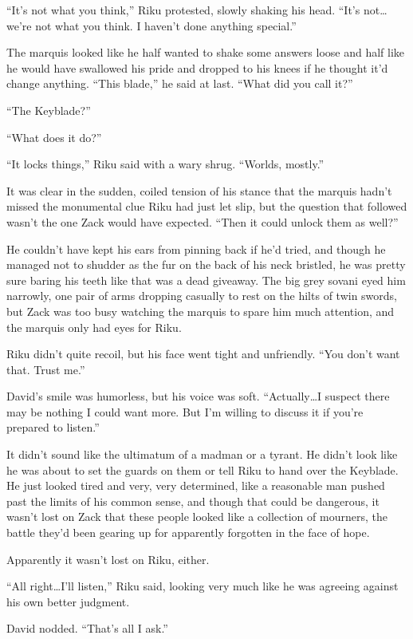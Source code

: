 ``It's not what you think,'' Riku protested, slowly shaking his head. ``It's not\ldots we're not what you think. I haven't done anything special.''

The marquis looked like he half wanted to shake some answers loose and half like he would have swallowed his pride and dropped to his knees if he thought it'd change anything. ``This blade,'' he said at last. ``What did you call it?''

``The Keyblade?''

``What does it do?''

``It locks things,'' Riku said with a wary shrug. ``Worlds, mostly.''

It was clear in the sudden, coiled tension of his stance that the marquis hadn't missed the monumental clue Riku had just let slip, but the question that followed wasn't the one Zack would have expected. ``Then it could unlock them as well?''

He couldn't have kept his ears from pinning back if he'd tried, and though he managed not to shudder as the fur on the back of his neck bristled, he was pretty sure baring his teeth like that was a dead giveaway. The big grey sovani eyed him narrowly, one pair of arms dropping casually to rest on the hilts of twin swords, but Zack was too busy watching the marquis to spare him much attention, and the marquis only had eyes for Riku.

Riku didn't quite recoil, but his face went tight and unfriendly. ``You don't want that. Trust me.''

David's smile was humorless, but his voice was soft. ``Actually\ldots I suspect there may be nothing I could want more. But I'm willing to discuss it if you're prepared to listen.''

It didn't sound like the ultimatum of a madman or a tyrant. He didn't look like he was about to set the guards on them or tell Riku to hand over the Keyblade. He just looked tired and very, very determined, like a reasonable man pushed past the limits of his common sense, and though that could be dangerous, it wasn't lost on Zack that these people looked like a collection of mourners, the battle they'd been gearing up for apparently forgotten in the face of hope.

Apparently it wasn't lost on Riku, either.

``All right\ldots I'll listen,'' Riku said, looking very much like he was agreeing against his own better judgment.

David nodded. ``That's all I ask.''


